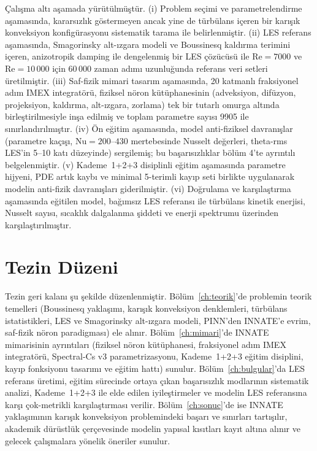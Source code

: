 Çalışma altı aşamada yürütülmüştür. (i) Problem seçimi ve parametrelendirme aşamasında, kararsızlık göstermeyen ancak yine de türbülans içeren bir karışık konveksiyon konfigürasyonu sistematik tarama ile belirlenmiştir. (ii) LES referans aşamasında, Smagorinsky alt-ızgara modeli ve Boussinesq kaldırma terimini içeren, anizotropik damping ile dengelenmiş bir LES çözücüsü ile $\mathrm{Re}=7000$ ve $\mathrm{Re}=10\,000$ için 60\,000 zaman adımı uzunluğunda referans veri setleri üretilmiştir. (iii) Saf-fizik mimari tasarım aşamasında, 20 katmanlı fraksiyonel adım IMEX integratörü, fiziksel nöron kütüphanesinin (adveksiyon, difüzyon, projeksiyon, kaldırma, alt-ızgara, zorlama) tek bir tutarlı omurga altında birleştirilmesiyle inşa edilmiş ve toplam parametre sayısı 9905 ile sınırlandırılmıştır. (iv) Ön eğitim aşamasında, model anti-fiziksel davranışlar (parametre kaçışı, $\mathrm{Nu}=200$--$430$ mertebesinde Nusselt değerleri, theta-rms LES'in 5--10 katı düzeyinde) sergilemiş; bu başarısızlıklar bölüm 4'te ayrıntılı belgelenmiştir. (v) Kademe~1+2+3 disiplinli eğitim aşamasında parametre hijyeni, PDE artık kaybı ve minimal 5-terimli kayıp seti birlikte uygulanarak modelin anti-fizik davranışları giderilmiştir. (vi) Doğrulama ve karşılaştırma aşamasında eğitilen model, bağımsız LES referansı ile türbülans kinetik enerjisi, Nusselt sayısı, sıcaklık dalgalanma şiddeti ve enerji spektrumu üzerinden karşılaştırılmıştır.

\section{Tezin Düzeni}

Tezin geri kalanı şu şekilde düzenlenmiştir. Bölüm~\ref{ch:teorik}'de problemin teorik temelleri (Boussinesq yaklaşımı, karışık konveksiyon denklemleri, türbülans istatistikleri, LES ve Smagorinsky alt-ızgara modeli, PINN'den INNATE'e evrim, saf-fizik nöron paradigması) ele alınır. Bölüm~\ref{ch:mimari}'de INNATE mimarisinin ayrıntıları (fiziksel nöron kütüphanesi, fraksiyonel adım IMEX integratörü, Spectral-Cs v3 parametrizasyonu, Kademe~1+2+3 eğitim disiplini, kayıp fonksiyonu tasarımı ve eğitim hattı) sunulur. Bölüm~\ref{ch:bulgular}'da LES referans üretimi, eğitim sürecinde ortaya çıkan başarısızlık modlarının sistematik analizi, Kademe~1+2+3 ile elde edilen iyileştirmeler ve modelin LES referansına karşı çok-metrikli karşılaştırması verilir. Bölüm~\ref{ch:sonuc}'de ise INNATE yaklaşımının karışık konveksiyon problemindeki başarı ve sınırları tartışılır, akademik dürüstlük çerçevesinde modelin yapısal kısıtları kayıt altına alınır ve gelecek çalışmalara yönelik öneriler sunulur.
